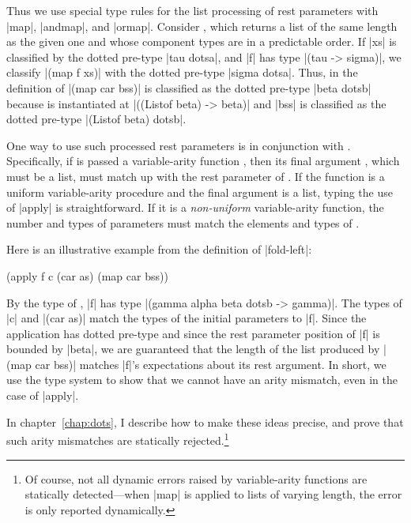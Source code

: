 \begin{schemeregion}
Thus we use special type rules for the list
processing of rest parameters with \scheme|map|, \scheme|andmap|, and
\scheme|ormap|.  Consider , which returns a list of the
 same length as the given one and whose component types are in a predictable
 order.  If \scheme|xs| is classified by the dotted pre-type
 \scheme|tau dotsa|, and \scheme|f| has type \scheme|(tau -> sigma)|, we classify
 \scheme|(map f xs)| with the dotted pre-type \scheme|sigma dotsa|.
 Thus, in the definition of  \scheme|(map car bss)|
 is classified as the dotted pre-type \scheme|beta dotsb| because
  is instantiated at \scheme|((Listof beta) -> beta)| and
 \scheme|bss| is classified as the dotted pre-type \scheme|(Listof beta)
 dotsb|.

One way to use such processed rest parameters is in conjunction with
 . Specifically, if  is passed a variable-arity
 function , then its final argument , which must be a
 list, must match up with the rest parameter of .  If the
 function is a uniform variable-arity procedure and the final argument is a
 list, typing the use of \scheme|apply| is straightforward. If it is a
 {\em non-uniform} variable-arity function, the number and types of parameters
 must match the elements and types of .

Here is an illustrative example from the definition of \scheme|fold-left|:
\begin{schemedisplay}
(apply f c (car as) (map car bss))
\end{schemedisplay}
 By the type of
 , \scheme|f| has type \scheme|(gamma alpha beta dotsb ->
 gamma)|.  The types of \scheme|c| and \scheme|(car as)| match the types of
 the initial parameters to \scheme|f|.  Since the  application
 has dotted pre-type  and since the rest parameter
 position of \scheme|f| is bounded by \scheme|beta|, we are guaranteed that
 the length of the list produced by \scheme|(map car bss)| matches \scheme|f|'s
 expectations about its rest argument.  In short, we use
 the type system to show that we cannot have an arity mismatch,
 even in the case of \scheme|apply|.

In chapter~\ref{chap:dots}, I describe how to make these ideas
precise, and prove that such arity mismatches are statically 
rejected.\footnote{Of course, not all dynamic errors raised by
  variable-arity functions are statically detected---when \scheme|map|
is applied to lists of varying length, the error is only reported
dynamically.} 



\end{schemeregion}
